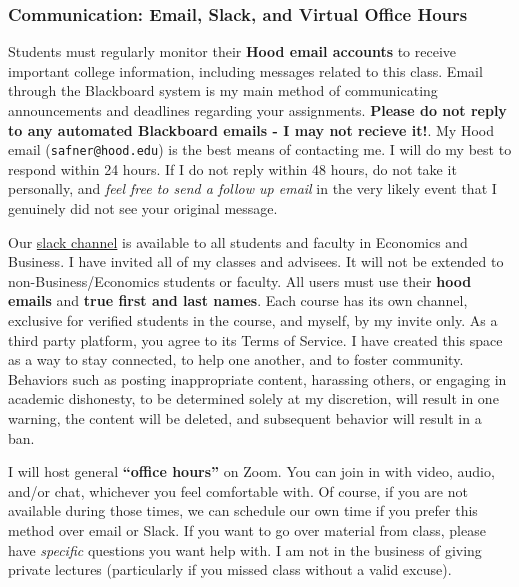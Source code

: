 \documentclass{article}
\begin{document}
\hypertarget{communication-email-slack-and-virtual-office-hours}{%
\subsubsection*{Communication: Email, Slack, and Virtual Office
Hours}\label{communication-email-slack-and-virtual-office-hours}}

Students must regularly monitor their \textbf{Hood email accounts} to
receive important college information, including messages related to
this class. Email through the Blackboard system is my main method of
communicating announcements and deadlines regarding your assignments.
\textbf{Please do not reply to any automated Blackboard emails - I may
not recieve it!}. My Hood email (\texttt{safner@hood.edu}) is the best
means of contacting me. I will do my best to respond within 24 hours. If
I do not reply within 48 hours, do not take it personally, and
\emph{feel free to send a follow up email} in the very likely event that
I genuinely did not see your original message.

Our \href{https://hoodcollegeeconomics.slack.com}{slack channel} is
available to all students and faculty in Economics and Business. I have
invited all of my classes and advisees. It will not be extended to
non-Business/Economics students or faculty. All users must use their
\textbf{hood emails} and \textbf{true first and last names}. Each course
has its own channel, exclusive for verified students in the course, and
myself, by my invite only. As a third party platform, you agree to its
Terms of Service. I have created this space as a way to stay connected,
to help one another, and to foster community. Behaviors such as posting
inappropriate content, harassing others, or engaging in academic
dishonesty, to be determined solely at my discretion, will result in one
warning, the content will be deleted, and subsequent behavior will
result in a ban.

I will host general \textbf{``office hours''} on Zoom. You can join in
with video, audio, and/or chat, whichever you feel comfortable with. Of
course, if you are not available during those times, we can schedule our
own time if you prefer this method over email or Slack. If you want to
go over material from class, please have \emph{specific} questions you
want help with. I am not in the business of giving private lectures
(particularly if you missed class without a valid excuse).
\end{document}
